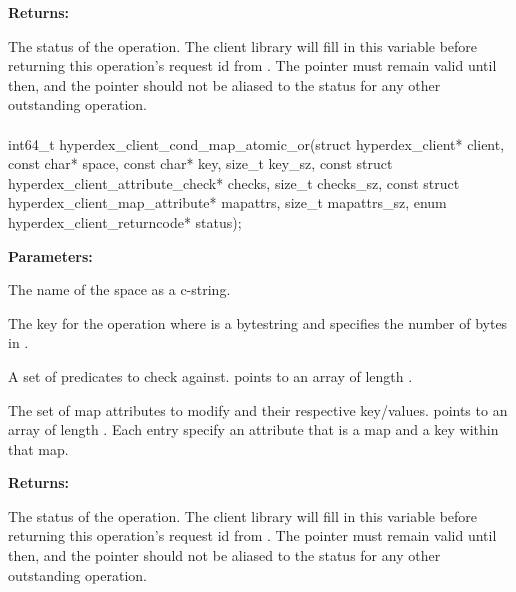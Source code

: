 \noindent\textbf{Returns:}
\begin{description}[labelindent=\widthof{{\code{status}}},leftmargin=*,noitemsep,nolistsep,align=right]
\item[\code{status}] The status of the operation.  The client library will fill in this variable before returning this operation's request id from .  The pointer must remain valid until then, and the pointer should not be aliased to the status for any other outstanding operation.
\end{description}

\paragraph{}
\label{api:c:cond_map_atomic_or}
\begin{ccode}
int64_t hyperdex_client_cond_map_atomic_or(struct hyperdex_client* client,
                const char* space,
                const char* key, size_t key_sz,
                const struct hyperdex_client_attribute_check* checks, size_t checks_sz,
                const struct hyperdex_client_map_attribute* mapattrs, size_t mapattrs_sz,
                enum hyperdex_client_returncode* status);
\end{ccode}
\funcdesc 

\noindent\textbf{Parameters:}
\begin{description}[labelindent=\widthof{{\code{mapattrs}, \code{mapattrs\_sz}}},leftmargin=*,noitemsep,nolistsep,align=right]
\item[\code{space}] The name of the space as a c-string.
\item[\code{key}, \code{key\_sz}] The key for the operation where  is a bytestring and  specifies the number of bytes in .
\item[\code{checks}, \code{checks\_sz}] A set of predicates to check against.   points to an array of length .
\item[\code{mapattrs}, \code{mapattrs\_sz}] The set of map attributes to modify and their respective key/values.   points to an array of length .  Each entry specify an attribute that is a map and a key within that map.
\end{description}

\noindent\textbf{Returns:}
\begin{description}[labelindent=\widthof{{\code{status}}},leftmargin=*,noitemsep,nolistsep,align=right]
\item[\code{status}] The status of the operation.  The client library will fill in this variable before returning this operation's request id from .  The pointer must remain valid until then, and the pointer should not be aliased to the status for any other outstanding operation.
\end{description}

